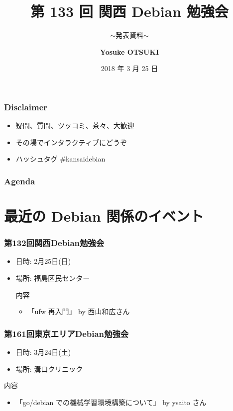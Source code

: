 \documentclass[cjk,dvipdfmx,10pt,compress,%
hyperref={bookmarks=true,bookmarksnumbered=true,bookmarksopen=false,%
colorlinks=false,%
pdftitle={第 132 回 関西 Debian 勉強会},%
pdfauthor={かわだ},%
pdfsubject={資料},%
}]{beamer}
\title{第 133 回 関西 Debian 勉強会}
\subtitle{$\sim$発表資料$\sim$}
\author[Yosuke OTSUKI]{{\large\bf Yosuke OTSUKI}}
\institute[Debian JP]{{\normalsize\tt 関西 Debian 勉強会}}
\date{{\small 2018 年 3 月 25 日}}
\begin{document}
\settitleslide
\begin{frame}
\titlepage
\end{frame}
\setdefaultslide

\begin{frame}[fragile]
  \frametitle{Disclaimer}
  \begin{itemize}
  \item 疑問、質問、ツッコミ、茶々、\alert{大歓迎}
  \item その場でインタラクティブにどうぞ
  \item ハッシュタグ \#kansaidebian
  \end{itemize}
\end{frame}

\begin{frame}[fragile]
\frametitle{Agenda}

\tableofcontents

\end{frame}

\section{最近の Debian 関係のイベント}

\begin{frame}[fragile]
  \frametitle{第132回関西Debian勉強会}
  \begin{itemize}
  \item 日時: 2月25日(日)
  \item 場所: 福島区民センター
  \begin{block}{内容}
    \begin{itemize}
    \item 「ufw 再入門」 by 西山和広さん
    \end{itemize}
  \end{block}
\end{itemize}
\end{frame}

\begin{frame}[fragile]
  \frametitle{第161回東京エリアDebian勉強会}
  \begin{itemize}
  \item 日時: 3月24日(土)
  \item 場所: 溝口クリニック
  \end{itemize}
  \begin{block}{内容}
    \begin{itemize}
    \item 「go/debian での機械学習環境構築について」 by ysaito さん
    \end{itemize}
  \end{block}
\end{frame}
\end{document}
